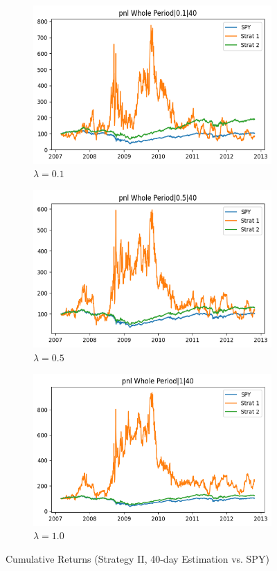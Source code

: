 \documentclass[12pt]{article}
\begin{document}
\begin{figure}[H]
\centering
\begin{subfigure}{0.32\textwidth}
\includegraphics[width=\linewidth]{"plots/pnl_wholeperiod_0.1_40.png"}
\caption{$\lambda=0.1$}
\end{subfigure}
\begin{subfigure}{0.32\textwidth}
\includegraphics[width=\linewidth]{"plots/pnl_wholeperiod_0.5_40.png"}
\caption{$\lambda=0.5$}
\end{subfigure}
\begin{subfigure}{0.32\textwidth}
\includegraphics[width=\linewidth]{"plots/pnl_wholeperiod_1_40.png"}
\caption{$\lambda=1.0$}
\end{subfigure}
\caption{Cumulative Returns (Strategy II, 40-day Estimation vs. SPY)}
\label{fig:pnl_40}
\end{figure}
\end{document}
